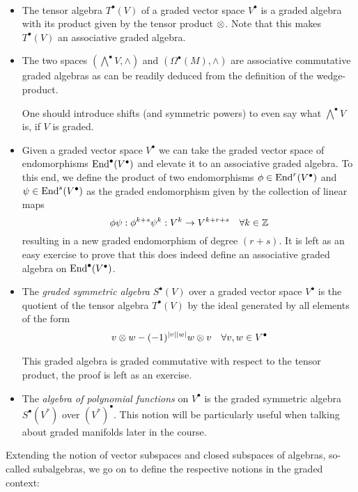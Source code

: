 \begin{example}~
\begin{itemize}
  \item The tensor algebra $T^\bullet(V)$ of a graded vector space $V^\bullet$ is a graded algebra with its product given by the tensor product $\mathbin{\mathop{\otimes}\displaylimits_{}}$. Note that this makes $T^\bullet(V)$ an associative graded algebra.

  \item The two spaces $(\bigwedge^\bullet V, \wedge)$ and $(\Omega^\bullet(M), \wedge)$ are associative commutative graded algebras as can be readily deduced from the definition of the wedge-product. \begin{mdframed}One should introduce shifts (and symmetric powers) to even say what $\bigwedge^\bullet V$ is, if $V$ is graded.\end{mdframed}

  \item Given a graded vector space $V^\bullet$ we can take the graded vector space of endomorphisms $\operatorname{End}^\bullet(V^\bullet)$  and elevate it to an associative graded algebra. To this end, we define the product of two endomorphisms $\phi \in \End^r(V^\bullet)$ and $\psi \in \operatorname{End}^s(V^\bullet)$ as the graded endomorphism given by the collection of linear maps
  $$ \phi \psi : \phi^{k+s}\psi^k: V^k \ra V^{k+r+s}\quad \forall k\in \ZZ $$
  resulting in a new graded endomorphism of degree $(r+s)$. It is left as an easy exercise to prove that this does indeed define an associative graded algebra on $\operatorname{End}^\bullet(V^\bullet)$.

  \item The \emph{graded symmetric algebra} $S^\bullet(V)$ over a graded vector space $V^\bullet$ is the quotient of the tensor algebra $T^\bullet(V)$ by the ideal generated by all elements of the form
  $$ v\mathbin{\mathop{\otimes}\displaylimits_{}}w - (-1)^{|v||w|} w \mathbin{\mathop{\otimes}\displaylimits_{}}v \quad \forall v,w \in V^\bullet $$
  This graded algebra is graded commutative with respect to the tensor product, the proof is left as an exercise.

 \item The \emph{algebra of polynomial functions} on $V^\bullet$ is the graded symmetric algebra $S^\bullet(V^*)$ over $(V^*)^\bullet$. This notion will be particularly useful when talking about graded manifolds later in the course.
\end{itemize}
\end{example}

Extending the notion of vector subspaces and closed subspaces of algebras, so-called subalgebras, we go on to define the respective notions in the graded context:

